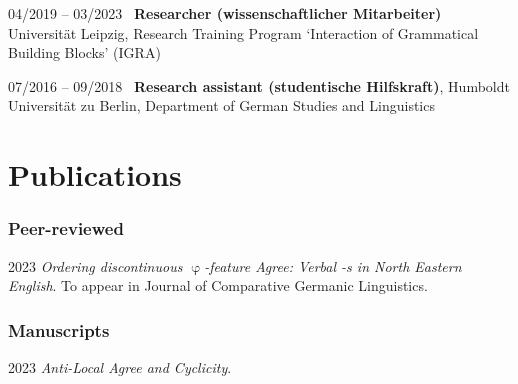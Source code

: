 \documentclass[11pt]{article}
\begin{document}
\begin{list}{}{
	\setlength{\leftmargin}{3.5cm}
	\setlength{\itemindent}{-2.5cm}
	}

	\item[04/2019 -- 03/2023~] \textbf{Researcher (wissenschaftlicher Mitarbeiter)} Universität Leipzig, Research Training Program `Interaction of Grammatical Building Blocks' (IGRA)
	
	\item[07/2016 -- 09/2018~] \textbf{Research assistant (studentische Hilfskraft)}, Humboldt Universität zu Berlin, Department of German Studies and Linguistics

\end{list}




\section*{Publications}
%	
\vspace{-1em}
\subsubsection*{Peer-reviewed}
\begin{list}{}{
		\setlength{\leftmargin}{3.5cm}
		\setlength{\itemindent}{-2.5cm}
	}
	
	\item[2023\phantom{~--~03/2022/04~}] \textit{Ordering discontinuous $\upvarphi$-feature Agree: Verbal -s in North Eastern English}. To appear in Journal of Comparative Germanic Linguistics.
\end{list}

\vspace{-1em}
\subsubsection*{Manuscripts}
\begin{list}{}{
		\setlength{\leftmargin}{3.5cm}
		\setlength{\itemindent}{-2.5cm}
	}
	
	\item[2023\phantom{~--~03/2022/04~}] \textit{Anti-Local Agree and Cyclicity}.
\end{list}
\end{document}
